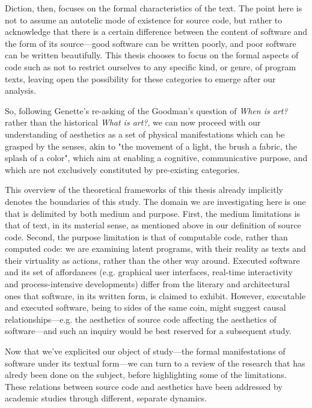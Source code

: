 Diction, then, focuses on the formal characteristics of the text. The point here is not to assume an autotelic mode of existence for source code, but rather to acknowledge that there is a certain difference between the content of software and the form of its source—good software can be written poorly, and poor software can be written beautifully. This thesis chooses to focus on the formal aspects of code such as not to restrict ourselves to any specific kind, or genre, of program texts, leaving open the possibility for these categories to emerge after our analysis.

So, following Genette's re-asking of the Goodman's question of \emph{When is art?} rather than the historical \emph{What is art?}, we can now proceed with our understanding of aesthetics as a set of physical manifestations which can be grasped by the senses, akin to "the movement of a light, the brush a fabric, the splash of a color"\cite{ranciere_aisthesis_2013}, which aim at enabling a cognitive, communicative purpose, and which are not exclusively constituted by pre-existing categories.

This overview of the theoretical frameworks of this thesis already implicitly denotes the boundaries of this study. The domain we are investigating here is one that is delimited by both medium and purpose. First, the medium limitations is that of text, in its material sense, as mentioned above in our definition of source code. Second, the purpose limitation is that of computable code, rather than computed code: we are examining latent programs, with their reality as texts and their virtuality as actions, rather than the other way around. Executed software and its set of affordances (e.g. graphical user interfaces\cite{gelernter_machine_1998}, real-time interactivity\cite{laurel_computers_1993} and process-intensive developments\cite{murray_hamlet_1998}) differ from the literary and architectural ones that software, in its written form, is claimed to exhibit. However, executable and executed software, being to sides of the same coin, might suggest causal relationships—e.g. the aesthetics of source code affecting the aesthetics of software—and such an inquiry would be best reserved for a subsequent study.

Now that we've explicited our object of study—the formal manifestations of software under its textual form—we can turn to a review of the research that has alredy been done on the subject, before highlighting some of the limitations. These relations between source code and aesthetics have been addressed by academic studies through different, separate dynamics.

